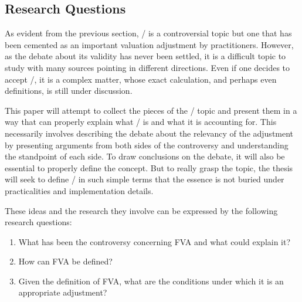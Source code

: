 \documentclass[main.tex]{subfiles}
\begin{document}
    \subsection{Research Questions}
        
    As evident from the previous section, \FVA/ is a controversial topic 
    but one that has been cemented as an important valuation adjustment by practitioners.
    However, as the debate about its validity has never been settled,
    it is a difficult topic to study with many sources pointing in different directions.
    Even if one decides to accept \FVA/, it is a complex matter,
    whose exact calculation, and perhaps even definitions, is still under discussion.

    This paper will attempt to collect the pieces of the \FVA/ topic
    and present them in a way that can properly explain what \FVA/ is and what it is accounting for.
    This necessarily involves describing the debate about the relevancy of the adjustment
    by presenting arguments from both sides of the controversy 
    and understanding the standpoint of each side.
    To draw conclusions on the debate, it will also be essential to properly define the concept.
    But to really grasp the topic, the thesis will seek to define \FVA/ in such simple terms 
    that the essence is not buried under practicalities and implementation details.

    These ideas and the research they involve can be expressed by the following research questions:
    \begin{enumerate}
        \item What has been the controversy concerning FVA and what could explain it?
        \item How can FVA be defined?
        \item Given the definition of FVA, 
              what are the conditions under which it is an appropriate adjustment?
    \end{enumerate}
\end{document}
